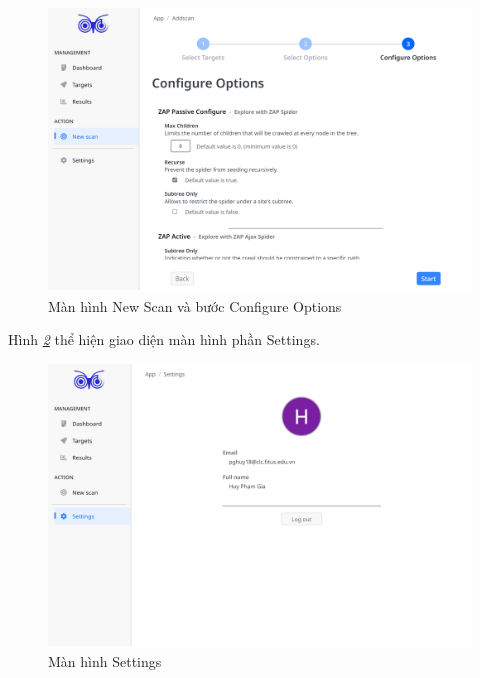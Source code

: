\begin{figure}[H]
      \centering
      \includegraphics[width=\textwidth]{applied-thesis-chapters/chapter-6/Màn hình New Scan và bước Configure Options.png}
      \caption{Màn hình New Scan và bước Configure Options}
      \label{fig:ManHinhNewScanVaConfigureOptions}
\end{figure}

\tab \tab Hình \textit{\ref{fig:ManHinhSettings} } thể hiện giao diện màn hình phần Settings.

\begin{figure}[H]
      \centering
      \includegraphics[width=\textwidth]{applied-thesis-chapters/chapter-6/Màn hình Settings.png}
      \caption{Màn hình Settings}
      \label{fig:ManHinhSettings}
\end{figure}

